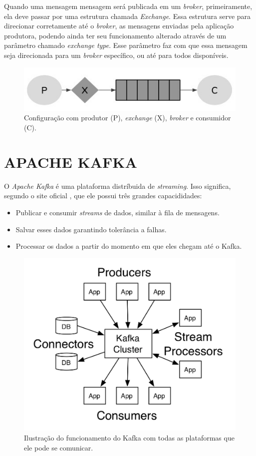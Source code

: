 \documentclass[letterpaper, 10 pt, conference]{ieeeconf}  %
\begin{document}
Quando uma mensagem mensagem será publicada em um \textit{broker}, primeiramente, ela deve passar por uma estrutura chamada \textit{Exchange}. Essa estrutura serve para direcionar corretamente até o \textit{broker}, as mensagens enviadas pela aplicação produtora, podendo ainda ter seu funcionamento alterado através de um parâmetro chamado \textit{exchange type}. Esse parâmetro faz com que essa mensagem seja direcionada para um \textit{broker} específico, ou até para todos disponíveis.


\begin{figure}[ht]
\centering
\includegraphics[width=.4\textwidth]{exchange.jpeg}
\caption{Configuração com produtor (P), \textit{exchange} (X), \textit{broker} e consumidor (C).}
\label{fig:exchange}
\end{figure}


\section{APACHE KAFKA}

O \textit{Apache Kafka} é uma plataforma distríbuida de \textit{streaming}. Isso significa, segundo o site oficial \cite{c1}, que ele possui três grandes capacididades:

\begin{itemize}
\item Publicar e consumir \textit{streams} de dados, similar à fila de mensagens.
\item Salvar esses dados garantindo tolerância a falhas.
\item Processar os dados a partir do momento em que eles chegam até o Kafka.
\end{itemize}


\begin{figure}[ht]
\centering
\includegraphics[width=.35\textwidth]{kafka-usage.png}
\caption{Ilustração do funcionamento do Kafka com todas as plataformas que ele pode se comunicar.}
\label{fig:exchange}
\end{figure}
\end{document}
